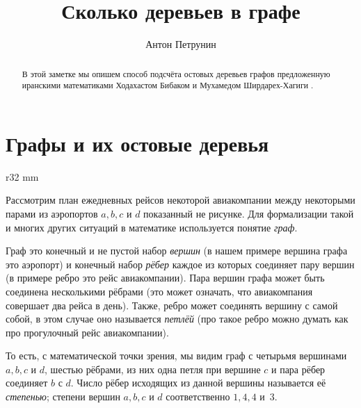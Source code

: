 \documentclass{article}
\begin{document}
\title{Сколько деревьев в графе}
\author{Антон Петрунин}
\date{}
\maketitle

\begin{abstract}
В этой заметке мы опишем способ подсчёта остовых деревьев графов
предложенную иранскими математиками 
Ходахастом Бибаком 
и Мухамедом Ширдарех-Хагиги \cite{haghighi-bibak}.
\end{abstract}


\section{Графы и их остовые деревья}

\begin{wrapfigure}{r}{32 mm}
\end{wrapfigure}

Рассмотрим план ежедневных рейсов некоторой авиакомпании между некоторыми парами из аэропортов $a,b,c$ и $d$
показанный не рисунке.
Для формализации такой и многих других ситуаций в математике используется понятие \emph{граф}.

Граф это конечный и не пустой набор \emph{вершин} (в нашем примере вершина графа это аэропорт) 
и конечный набор \emph{рёбер} каждое из которых соединяет пару вершин (в примере ребро это рейс авиакомпании).
Пара вершин графа может быть соединена несколькими рёбрами (это может означать, что авиакомпания совершает два рейса в день). 
Также, ребро может соединять вершину с самой собой, в этом случае оно называется \emph{петлёй} (про такое ребро можно думать как про прогулочный рейс авиакомпании).

То есть, с математической точки зрения, мы видим граф с четырьмя вершинами $a,b,c$ и $d$, 
шестью рёбрами, из них
одна петля при вершине $c$ и пара рёбер соединяет $b$ с $d$.
Число рёбер исходящих из данной вершины называется её \emph{степенью};
степени вершин $a,b,c$ и $d$ соответственно $1,4,4$ и~$3$.
\end{document}
